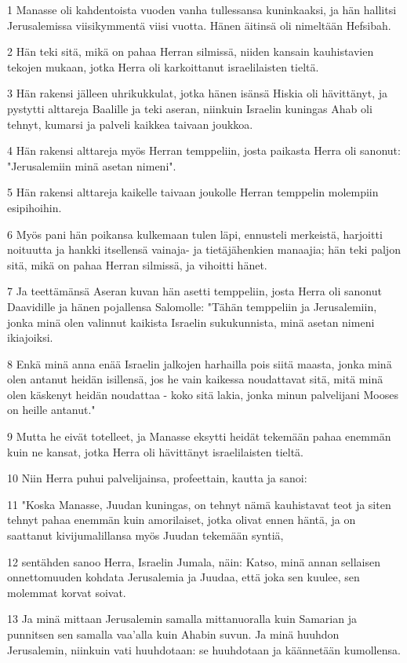 \par 1 Manasse oli kahdentoista vuoden vanha tullessansa kuninkaaksi, ja hän hallitsi Jerusalemissa viisikymmentä viisi vuotta. Hänen äitinsä oli nimeltään Hefsibah.
\par 2 Hän teki sitä, mikä on pahaa Herran silmissä, niiden kansain kauhistavien tekojen mukaan, jotka Herra oli karkoittanut israelilaisten tieltä.
\par 3 Hän rakensi jälleen uhrikukkulat, jotka hänen isänsä Hiskia oli hävittänyt, ja pystytti alttareja Baalille ja teki aseran, niinkuin Israelin kuningas Ahab oli tehnyt, kumarsi ja palveli kaikkea taivaan joukkoa.
\par 4 Hän rakensi alttareja myös Herran temppeliin, josta paikasta Herra oli sanonut: "Jerusalemiin minä asetan nimeni".
\par 5 Hän rakensi alttareja kaikelle taivaan joukolle Herran temppelin molempiin esipihoihin.
\par 6 Myös pani hän poikansa kulkemaan tulen läpi, ennusteli merkeistä, harjoitti noituutta ja hankki itsellensä vainaja- ja tietäjähenkien manaajia; hän teki paljon sitä, mikä on pahaa Herran silmissä, ja vihoitti hänet.
\par 7 Ja teettämänsä Aseran kuvan hän asetti temppeliin, josta Herra oli sanonut Daavidille ja hänen pojallensa Salomolle: "Tähän temppeliin ja Jerusalemiin, jonka minä olen valinnut kaikista Israelin sukukunnista, minä asetan nimeni ikiajoiksi.
\par 8 Enkä minä anna enää Israelin jalkojen harhailla pois siitä maasta, jonka minä olen antanut heidän isillensä, jos he vain kaikessa noudattavat sitä, mitä minä olen käskenyt heidän noudattaa - koko sitä lakia, jonka minun palvelijani Mooses on heille antanut."
\par 9 Mutta he eivät totelleet, ja Manasse eksytti heidät tekemään pahaa enemmän kuin ne kansat, jotka Herra oli hävittänyt israelilaisten tieltä.
\par 10 Niin Herra puhui palvelijainsa, profeettain, kautta ja sanoi:
\par 11 "Koska Manasse, Juudan kuningas, on tehnyt nämä kauhistavat teot ja siten tehnyt pahaa enemmän kuin amorilaiset, jotka olivat ennen häntä, ja on saattanut kivijumalillansa myös Juudan tekemään syntiä,
\par 12 sentähden sanoo Herra, Israelin Jumala, näin: Katso, minä annan sellaisen onnettomuuden kohdata Jerusalemia ja Juudaa, että joka sen kuulee, sen molemmat korvat soivat.
\par 13 Ja minä mittaan Jerusalemin samalla mittanuoralla kuin Samarian ja punnitsen sen samalla vaa'alla kuin Ahabin suvun. Ja minä huuhdon Jerusalemin, niinkuin vati huuhdotaan: se huuhdotaan ja käännetään kumollensa.
